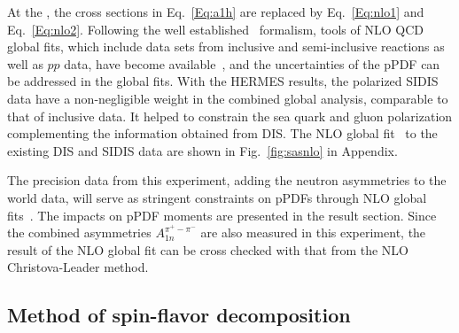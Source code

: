 At the \nloo, the cross sections in Eq.~\ref{Eq:a1h}  are replaced by Eq.~\ref{Eq:nlo1}
and Eq.~\ref{Eq:nlo2}. Following the well established~\cite{defs2000} formalism, 
tools of NLO QCD global fits,
which include data sets from inclusive and semi-inclusive reactions as well as $pp$ data,
have become available~\cite{sassotnlo,dssv2008}, and the uncertainties of the pPDF 
can be addressed in the global fits.
With the HERMES results, the polarized SIDIS data 
have a non-negligible weight in the combined global analysis, 
comparable to that of inclusive data. It helped 
to constrain the sea quark and gluon polarization complementing 
the information obtained from DIS.
The NLO global fit~\cite{sassotnlo} to the existing DIS and SIDIS data are shown in Fig.~\ref{fig:sasnlo} in Appendix. 

The precision data from this experiment, adding the 
 neutron asymmetries to the world data,  
will serve as stringent constraints on 
pPDFs through NLO global fits~\cite{epjcxj2006}.  
The impacts on pPDF moments are presented in the result section. 
Since the combined asymmetries $A_{1n}^{\pi^+ -\pi^-}$ 
are also measured in this experiment,  the result of the NLO global fit 
can be  cross checked with that from the NLO Christova-Leader method.

\subsection{Method of spin-flavor decomposition}

